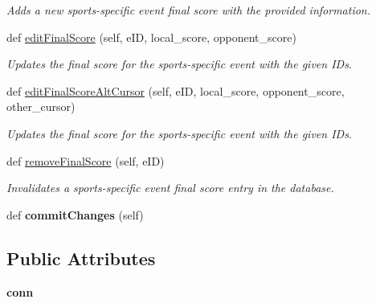 \begin{DoxyCompactItemize}
\begin{DoxyCompactList}\small\item\em Adds a new sports-\/specific event final score with the provided information. \end{DoxyCompactList}\item 
def \hyperlink{classhandler_1_1dao_1_1final__score__dao_1_1_final_score_d_a_o_ab1aa9c08ee3c3daf1b5dd0a482f40e24}{edit\+Final\+Score} (self, e\+ID, local\+\_\+score, opponent\+\_\+score)
\begin{DoxyCompactList}\small\item\em Updates the final score for the sports-\/specific event with the given I\+Ds. \end{DoxyCompactList}\item 
def \hyperlink{classhandler_1_1dao_1_1final__score__dao_1_1_final_score_d_a_o_aafed0bf1088db869afca195a3a7e4fb2}{edit\+Final\+Score\+Alt\+Cursor} (self, e\+ID, local\+\_\+score, opponent\+\_\+score, other\+\_\+cursor)
\begin{DoxyCompactList}\small\item\em Updates the final score for the sports-\/specific event with the given I\+Ds. \end{DoxyCompactList}\item 
def \hyperlink{classhandler_1_1dao_1_1final__score__dao_1_1_final_score_d_a_o_a750aa3375dc03fbc85025476a9974349}{remove\+Final\+Score} (self, e\+ID)
\begin{DoxyCompactList}\small\item\em Invalidates a sports-\/specific event final score entry in the database. \end{DoxyCompactList}\item 
\mbox{\label{classhandler_1_1dao_1_1final__score__dao_1_1_final_score_d_a_o_af99181eb8ea45373a933a6c3a0bb65db}} 
def {\bfseries commit\+Changes} (self)
\end{DoxyCompactItemize}
\subsection*{Public Attributes}
\begin{DoxyCompactItemize}
\item 
\mbox{\label{classhandler_1_1dao_1_1final__score__dao_1_1_final_score_d_a_o_a2cc4150a86f8f0d8aad3384c99e2d18b}} 
{\bfseries conn}
\end{DoxyCompactItemize}



